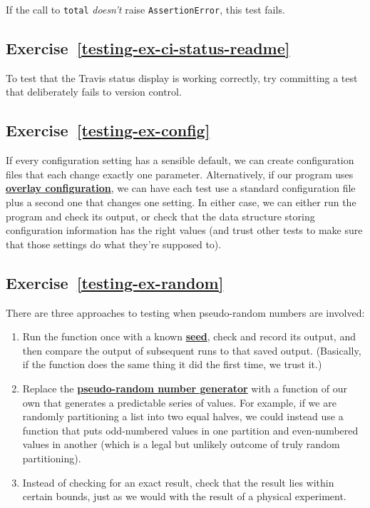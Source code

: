 \documentclass[
]{krantz}
\newcommand{\gref}[2]{\hyperlink{#2}{\textbf{#1}}}
\begin{document}
If the call to \texttt{total} \emph{doesn't} raise \texttt{AssertionError}, this test fails.

\hypertarget{exercise-reftesting-ex-ci-status-readme}{%
\subsection*{Exercise~\ref{testing-ex-ci-status-readme}}\label{exercise-reftesting-ex-ci-status-readme}}


To test that the Travis status display is working correctly,
try committing a test that deliberately fails to version control.

\hypertarget{exercise-reftesting-ex-config}{%
\subsection*{Exercise~\ref{testing-ex-config}}\label{exercise-reftesting-ex-config}}


If every configuration setting has a sensible default,
we can create configuration files that each change exactly one parameter.
Alternatively,
if our program uses \gref{overlay configuration}{overlay\_configuration},
we can have each test use a standard configuration file plus a second one that changes one setting.
In either case,
we can either run the program and check its output,
or check that the data structure storing configuration information has the right values
(and trust other tests to make sure that those settings do what they're supposed to).

\hypertarget{exercise-reftesting-ex-random}{%
\subsection*{Exercise~\ref{testing-ex-random}}\label{exercise-reftesting-ex-random}}


There are three approaches to testing when pseudo-random numbers are involved:

\begin{enumerate}
\def\labelenumi{\arabic{enumi}.}
\item
  Run the function once with a known \gref{seed}{seed},
  check and record its output,
  and then compare the output of subsequent runs to that saved output.
  (Basically, if the function does the same thing it did the first time, we trust it.)
\item
  Replace the \gref{pseudo-random number generator}{prng} with a function of our own
  that generates a predictable series of values.
  For example,
  if we are randomly partitioning a list into two equal halves,
  we could instead use a function that puts odd-numbered values in one partition
  and even-numbered values in another
  (which is a legal but unlikely outcome of truly random partitioning).
\item
  Instead of checking for an exact result,
  check that the result lies within certain bounds,
  just as we would with the result of a physical experiment.
\end{enumerate}
\end{document}
